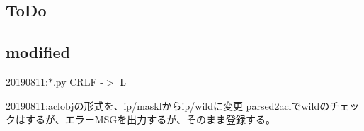 \subsection*{To\+Do}

\subsection*{modified}

20190811\+:$\ast$.py C\+R\+LF -\/$>$ L

20190811\+:aclobjの形式を、ip/masklからip/wildに変更 parsed2aclでwildのチェックはするが、エラー\+M\+S\+Gを出力するが、そのまま登録する。 